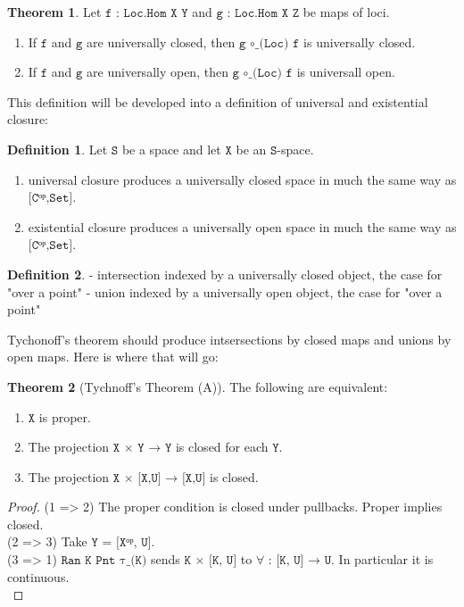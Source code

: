 \documentclass{book}
\theoremstyle{definition}
\newtheorem{definition}{Definition}
\newtheorem{theorem}{Theorem}
\begin{document}
\begin{theorem}
Let $\texttt{f : Loc.Hom X Y}$ and $\texttt{g : Loc.Hom X Z}$ be maps of loci.
\begin{enumerate}
\item If $\texttt{f}$ and $\texttt{g}$ are universally closed, then $\texttt{g ∘\_(Loc) f}$ is universally closed.
\item If $\texttt{f}$ and $\texttt{g}$ are universally open, then $\texttt{g ∘\_(Loc) f}$ is universall open. 
\end{enumerate}
\end{theorem}

This definition will be developed into a definition of universal and existential closure:

\begin{definition}
Let $\texttt{S}$ be a space and let $\texttt{X}$ be an $\texttt{S}$-space. 
\begin{enumerate}
\item universal closure produces a universally closed space in much the same way as $\texttt{[Cᵒᵖ,Set]}$.
\item existential closure produces a universally open space in much the same way as $\texttt{[Cᵒᵖ,Set]}$.
\end{enumerate}
\end{definition}

\begin{definition}
- intersection indexed by a universally closed object, the case for "over a point"
- union indexed by a universally open object, the case for "over a point"
\end{definition}

Tychonoff's theorem should produce intsersections by closed maps and unions by open maps. Here is where that will go:

\begin{theorem}[Tychnoff's Theorem (A)]
The following are equivalent:
\begin{enumerate}
\item $\texttt{X}$ is proper.
\item The projection $\texttt{X × Y → Y}$ is closed for each $\texttt{Y}$.
\item The projection $\texttt{X × [X,U] → [X,U]}$ is closed. 
\end{enumerate}
\end{theorem}

\begin{proof}

(1 => 2) The proper condition is closed under pullbacks. Proper implies closed.\\

(2 => 3) Take $\texttt{Y = [Xᵒᵖ, U]}$.\\

(3 => 1)  $\texttt{Ran K Pnt τ\_(K)}$ sends $\texttt{K × [K, U]}$ to $\texttt{∀ : [K, U] → U}$. In particular it is continuous.\\

\end{proof}
\end{document}
